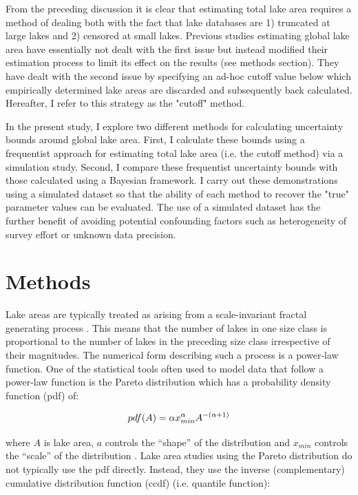\documentclass{article}
\begin{document}
From the preceding discussion it is clear that estimating total lake area requires a method of dealing both with the fact that lake databases are 1) truncated at large lakes and 2) censored at small lakes. Previous studies estimating global lake area have essentially not dealt with the first issue but instead modified their estimation process to limit its effect on the results (see methods section). They have dealt with the second issue by specifying an ad-hoc cutoff value below which empirically determined lake areas are discarded and subsequently back calculated. Hereafter, I refer to this strategy as the "cutoff" method.

In the present study, I explore two different methods for calculating uncertainty bounds around global lake area. First, I calculate these bounds using a frequentist approach for estimating total lake area (i.e. the cutoff method) via a simulation study. Second, I compare these frequentist uncertainty bounds with those calculated using a Bayesian framework. I carry out these demonstrations using a simulated dataset so that the ability of each method to recover the "true" parameter values can be evaluated. The use of a simulated dataset has the further benefit of avoiding potential confounding factors such as heterogeneity of survey effort or unknown data precision.

\section{Methods}

Lake areas are typically treated as arising from a scale-invariant fractal generating process \citep{winslowDoesLakeSize2015, downingGlobalAbundanceSize2006, mcdonald_regional_2012, goodchildLakesFractalSurfaces1988, hamiltonEstimationFractalDimension1992}. This means that the number of lakes in one size class is proportional to the number of lakes in the preceding size class irrespective of their magnitudes. The numerical form describing such a process is a power-law function. One of the statistical tools often used to model data that follow a power-law function is the Pareto distribution which has a probability density function (pdf) of:

\begin{equation}
	pdf(A) = \alpha x_{min}^{\alpha}A^{-(\alpha+1)} \\
	\label{eqn:pareto_pdf}
\end{equation}

where $A$ is lake area, $a$ controls the “shape” of the distribution and $x_{min}$ controls the “scale” of the distribution \citep{shaliziAdvancedDataAnalysis2017}. Lake area studies using the Pareto distribution do not typically use the pdf directly. Instead, they use the inverse (complementary) cumulative distribution function (ccdf) (i.e. quantile function):
\end{document}
